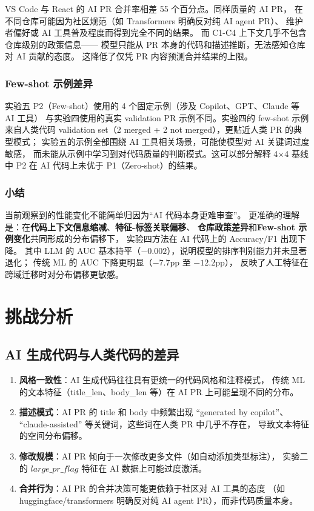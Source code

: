 \documentclass{experimentreport}
\begin{document}
VS Code 与 React 的 AI PR 合并率相差 55 个百分点。同样质量的 AI PR，
在不同仓库可能因为社区规范（如 Transformers 明确反对纯 AI agent PR）、
维护者偏好或 AI 工具普及程度而得到完全不同的结果。
而 C1-C4 上下文几乎不包含仓库级别的政策信息——
模型只能从 PR 本身的代码和描述推断，无法感知仓库对 AI 贡献的态度。
这降低了仅凭 PR 内容预测合并结果的上限。

\subsubsection{Few-shot 示例差异}

实验五 P2（Few-shot）使用的 4 个固定示例（涉及 Copilot、GPT、Claude 等 AI 工具）
与实验四使用的真实 validation PR 示例不同。实验四的 few-shot 示例来自人类代码
validation set（2 merged + 2 not merged），更贴近人类 PR 的典型模式；
实验五的示例全部围绕 AI 工具相关场景，可能使模型对 AI 关键词过度敏感，
而未能从示例中学习到对代码质量的判断模式。这可以部分解释
4×4 基线中 P2 在 AI 代码上未优于 P1（Zero-shot）的结果。

\subsubsection{小结}

当前观察到的性能变化不能简单归因为“AI 代码本身更难审查”。
更准确的理解是：在\textbf{代码上下文信息缩减}、\textbf{特征-标签关联偏移}、
\textbf{仓库政策差异}和\textbf{Few-shot 示例变化}共同形成的分布偏移下，
实验四方法在 AI 代码上的 Accuracy/F1 出现下降。
其中 LLM 的 AUC 基本持平（$-0.002$），说明模型的排序判别能力并未显著退化；
传统 ML 的 AUC 下降更明显（$-7.7$pp 至 $-12.2$pp），
反映了人工特征在跨域迁移时对分布偏移更敏感。

\section{挑战分析}

\subsection{AI 生成代码与人类代码的差异}

\begin{enumerate}
    \item \textbf{风格一致性}：AI 生成代码往往具有更统一的代码风格和注释模式，
          传统 ML 的文本特征（title\_len、body\_len 等）在 AI PR 上可能呈现不同的分布。
    \item \textbf{描述模式}：AI PR 的 title 和 body 中频繁出现 ``generated by copilot''、
          ``claude-assisted'' 等关键词，这些词在人类 PR 中几乎不存在，
          导致文本特征的空间分布偏移。
    \item \textbf{修改规模}：AI PR 倾向于一次修改更多文件（如自动添加类型标注），
          实验二的 $large\_pr\_flag$ 特征在 AI 数据上可能过度激活。
    \item \textbf{合并行为}：AI PR 的合并决策可能更依赖于社区对 AI 工具的态度
          （如 huggingface/transformers 明确反对纯 AI agent PR），而非代码质量本身。
\end{enumerate}
\end{document}
